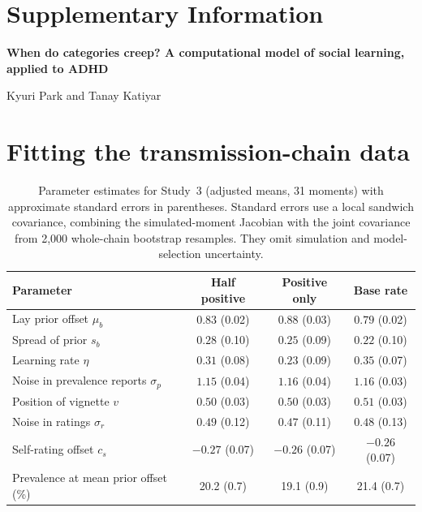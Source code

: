 \clearpage
\appendix
\renewcommand{\thesection}{\arabic{section}}
\renewcommand{\theHsection}{supp.\arabic{section}}
\renewcommand{\thetable}{S\arabic{table}}\renewcommand{\thefigure}{S\arabic{figure}}\setcounter{table}{0}\setcounter{figure}{0}
\renewcommand{\theHtable}{S\arabic{table}}\renewcommand{\theHfigure}{S\arabic{figure}}
\renewcommand{\thepage}{S\arabic{page}}\setcounter{page}{1}
\section*{Supplementary Information}
\noindent\textbf{When do categories creep? A computational model of social learning, applied to ADHD}\par\smallskip\noindent Kyuri Park and Tanay Katiyar\par\medskip

\section{Fitting the transmission-chain data}
\label{sec:si_fits}

\begin{table}[htbp]
\centering
\caption{Parameter estimates for Study~3 (adjusted means, 31 moments) with approximate standard errors in parentheses. Standard errors use a local sandwich covariance, combining the simulated-moment Jacobian with the joint covariance from 2,000 whole-chain bootstrap resamples. They omit simulation and model-selection uncertainty.}
\label{tab:params}
\begin{tabular}{lccc}
\toprule
Parameter & Half positive & Positive only & Base rate \\
\midrule
Lay prior offset $\mu_b$ & $0.83$ (0.02) & $0.88$ (0.03) & $0.79$ (0.02) \\
Spread of prior $s_b$ & $0.28$ (0.10) & $0.25$ (0.09) & $0.22$ (0.10) \\
Learning rate $\eta$ & $0.31$ (0.08) & $0.23$ (0.09) & $0.35$ (0.07) \\
Noise in prevalence reports $\sigma_p$ & $1.15$ (0.04) & $1.16$ (0.04) & $1.16$ (0.03) \\
Position of vignette $v$ & $0.50$ (0.03) & $0.50$ (0.03) & $0.51$ (0.03) \\
Noise in ratings $\sigma_r$ & $0.49$ (0.12) & $0.47$ (0.11) & $0.48$ (0.13) \\
Self-rating offset $c_s$ & $-0.27$ (0.07) & $-0.26$ (0.07) & $-0.26$ (0.07) \\
Prevalence at mean prior offset (\%) & 20.2 (0.7) & 19.1 (0.9) & 21.4 (0.7) \\
\bottomrule
\end{tabular}
\end{table}

